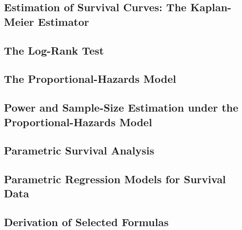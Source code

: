 \documentclass[12pt,]{article}
\begin{document}
\hypertarget{estimation-of-survival-curves-the-kaplan-meier-estimator}{%
\subsection{Estimation of Survival Curves: The Kaplan-Meier
Estimator}\label{estimation-of-survival-curves-the-kaplan-meier-estimator}}

\hypertarget{the-log-rank-test}{%
\subsection{The Log-Rank Test}\label{the-log-rank-test}}

\hypertarget{the-proportional-hazards-model}{%
\subsection{The Proportional-Hazards
Model}\label{the-proportional-hazards-model}}

\hypertarget{power-and-sample-size-estimation-under-the-proportional-hazards-model}{%
\subsection{Power and Sample-Size Estimation under the
Proportional-Hazards
Model}\label{power-and-sample-size-estimation-under-the-proportional-hazards-model}}

\hypertarget{parametric-survival-analysis}{%
\subsection{Parametric Survival
Analysis}\label{parametric-survival-analysis}}

\hypertarget{parametric-regression-models-for-survival-data}{%
\subsection{Parametric Regression Models for Survival
Data}\label{parametric-regression-models-for-survival-data}}

\hypertarget{derivation-of-selected-formulas-1}{%
\subsection{Derivation of Selected
Formulas}\label{derivation-of-selected-formulas-1}}
\end{document}
